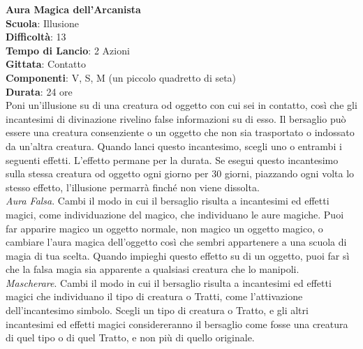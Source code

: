 \begin{multicols}{2}
\medskip\textbf{Aura Magica dell'Arcanista}\\
\textbf{Scuola}: Illusione\\
\textbf{Difficoltà}: 13\\
\textbf{Tempo di Lancio}: 2 Azioni\\
\textbf{Gittata}: Contatto\\
\textbf{Componenti}: V, S, M (un piccolo quadretto di seta)\\
\textbf{Durata}: 24 ore\\
Poni un'illusione su di una creatura od oggetto con cui sei in contatto, così che gli incantesimi di divinazione rivelino false informazioni su di esso. Il bersaglio può essere una creatura consenziente o un oggetto che non sia trasportato o indossato da un'altra creatura. Quando lanci questo incantesimo, scegli uno o entrambi i seguenti effetti. L'effetto permane per la durata. Se esegui questo incantesimo sulla stessa creatura od oggetto ogni giorno per 30 giorni, piazzando ogni volta lo stesso effetto, l'illusione permarrà finché non viene dissolta.\\
\textit{Aura Falsa}. Cambi il modo in cui il bersaglio risulta a incantesimi ed effetti magici, come individuazione del magico, che individuano le aure magiche. Puoi far apparire magico un oggetto normale, non magico un oggetto magico, o cambiare l'aura magica dell'oggetto così che sembri appartenere a una scuola di magia di tua scelta. Quando impieghi questo effetto su di un oggetto, puoi far sì che la falsa magia sia apparente a qualsiasi creatura che lo manipoli.\\ \textit{Mascherare}. Cambi il modo in cui il bersaglio risulta a incantesimi ed effetti magici che individuano il tipo di creatura o Tratti, come l'attivazione dell'incantesimo simbolo. Scegli un tipo di creatura o Tratto, e gli altri incantesimi ed effetti magici considereranno il bersaglio come fosse una creatura di quel tipo o di quel Tratto, e non più di quello originale.


\end{multicols}
